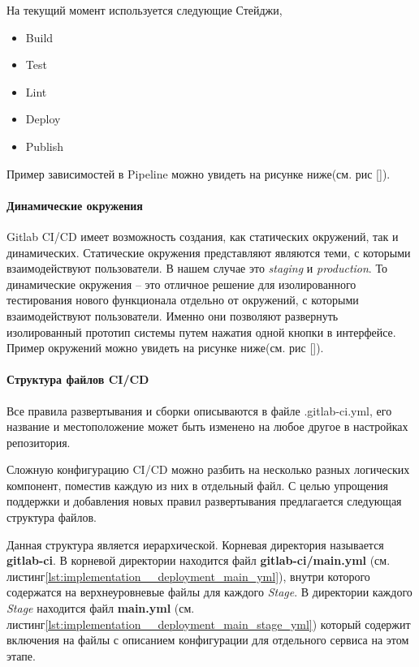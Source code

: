 На текущий момент используется следующие Стейджи,
\begin{itemize}
    \item Build
    \item Test
    \item Lint
    \item Deploy
    \item Publish
\end{itemize}

Пример зависимостей в Pipeline можно увидеть на рисунке ниже(см. рис []).

\paragraph{Динамические окружения}

Gitlab CI/CD имеет возможность создания, как статических окружений, так и динамических.
Статические окружения представляют являются теми, с которыми взаимодействуют пользователи.
В нашем случае это \textit{staging} и \textit{production}.
То динамические окружения -- это отличное решение для изолированного тестирования нового функционала
отдельно от окружений, с которыми взаимодействуют пользователи. Именно они позволяют развернуть
изолированный прототип системы путем нажатия одной кнопки в интерфейсе.
Пример окружений можно увидеть на рисунке ниже(см. рис []).

\paragraph{Структура файлов CI/CD}

Все правила развертывания и сборки описываются в файле .gitlab-ci.yml,
его название и местоположение может быть изменено на любое другое в настройках репозитория.

Сложную конфигурацию CI/CD можно разбить на несколько разных логических компонент, поместив каждую из них
в отдельный файл. С целью упрощения поддержки и добавления новых правил развертывания предлагается следующая структура файлов.


Данная структура является иерархической.
Корневая директория называется \textbf{gitlab-ci}. В корневой директории находится файл \textbf{gitlab-ci/main.yml}
(см. листинг\ref{lst:implementation__deployment_main_yml}),
внутри которого содержатся на верхнеуровневые файлы для каждого \textit{Stage}.
В директории каждого \textit{Stage} находится файл \textbf{main.yml} (см. листинг\ref{lst:implementation__deployment_main_stage_yml})
который содержит включения на файлы
с описанием конфигурации для отдельного сервиса на этом этапе.

